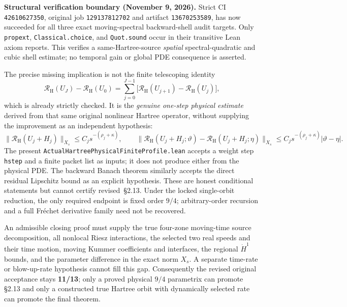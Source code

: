 \documentclass[11pt]{amsart}
\begin{document}
\medskip
\noindent\textbf{Structural verification boundary (November 9, 2026).}
Strict CI \texttt{42610627350}, original job \texttt{129137812702}
and artifact \texttt{13670253589}, has now succeeded for all three exact
moving-spectral backward-shell audit targets. Only
\texttt{propext}, \texttt{Classical.choice}, and \texttt{Quot.sound} occur
in their transitive Lean axiom reports.
This verifies a same-Hartree-source \emph{spatial} spectral-quadratic
and cubic shell estimate; no temporal gain or global PDE consequence is asserted.

The precise missing implication is not the finite telescoping identity
\[
  \mathcal R_{\mathrm H}(U_J)-\mathcal R_{\mathrm H}(U_0)
  =\sum_{j=0}^{J-1}
  \bigl[\mathcal R_{\mathrm H}(U_{j+1})
        -\mathcal R_{\mathrm H}(U_j)\bigr],
\]
which is already strictly checked.  It is the \emph{genuine one-step
physical estimate} derived from that same original nonlinear Hartree
operator, without supplying the improvement as an independent hypothesis:
\[
  \|\mathcal R_{\mathrm H}(U_j+H_j)\|_{X_s}
   \le C_j s^{-(\rho_j+\kappa)},\qquad
  \|\mathcal R_{\mathrm H}(U_j+H_j;\vartheta)
   -\mathcal R_{\mathrm H}(U_j+H_j;\eta)\|_{X_s}
   \le C_j s^{-(\rho_j+\kappa)}|\vartheta-\eta|.
\]
The present \texttt{ActualHartreePhysicalFiniteProfile.lean} accepts
a weight step \texttt{hstep} and a finite packet list as inputs; it does
not produce either from the physical PDE.  The backward Banach theorem
similarly accepts the direct residual Lipschitz bound as an explicit
hypothesis.  These are honest conditional statements but cannot certify
revised~\S2.13.  Under the locked single-orbit reduction, the only
required endpoint is fixed order $9/4$; arbitrary-order recursion and
a full Fr\'echet derivative family need not be recovered.

An admissible closing proof must supply the true four-zone moving-time
source decomposition, all nonlocal Riesz interactions, the selected
two real speeds and their time motion, moving Kummer coefficients and
interfaces, the regional $\dot H^1$ bounds, and the parameter difference
in the exact norm $X_s$.  A separate time-rate or blow-up-rate hypothesis
cannot fill this gap.  Consequently the revised original acceptance
stays \textbf{11/13}; only a proved physical $9/4$ parametrix can
promote \S2.13 and only a constructed true Hartree orbit with dynamically
selected rate can promote the final theorem.
\end{document}
